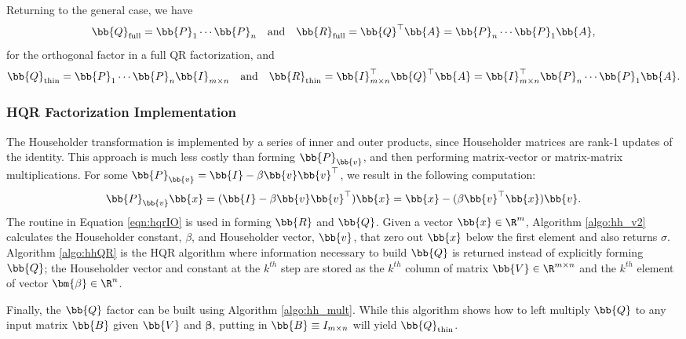 Returning to the general case, we have
\begin{equation}
\bb{Q}_{\text{full}} = \bb{P}_1 \cdots \bb{P}_n\quad \text{and} \quad \bb{R}_{\text{full}} = \bb{Q}^{\top}\bb{A} = \bb{P}_n\cdots \bb{P}_1\bb{A},
\end{equation}
for the orthogonal factor in a full QR factorization, and
\begin{equation}
\bb{Q}_{\text{thin}} = \bb{P}_1 \cdots \bb{P}_n\bb{I}_{m\times n}\quad \text{and} \quad \bb{R}_{\text{thin}} = \bb{I}_{m\times n}^{\top}\bb{Q}^{\top}\bb{A} = \bb{I}_{m\times n}^{\top}\bb{P}_n\cdots \bb{P}_1\bb{A}.
\end{equation}

\subsubsection{HQR Factorization Implementation}
\label{sssec:HQRfI}
The Householder transformation is implemented by a series of inner and outer products, since Householder matrices are rank-1 updates of the identity. 
This approach is much less costly than forming $\bb{P}_{\bb{v}}$, and then performing matrix-vector or matrix-matrix multiplications.
For some $\bb{P}_{\bb{v}}=\bb{I}-\beta \bb{v}\bb{v}^{\top}$, we result in the following computation:
\begin{equation}
\label{eqn:hqrIO}
\bb{P}_{\bb{v}} \bb{x} = (\bb{I}-\beta \bb{v}\bb{v}^{\top})\bb{x} = \bb{x} - (\beta \bb{v}^{\top}\bb{x})\bb{v}.
\end{equation}
The routine in Equation \ref{eqn:hqrIO} is used in forming $\bb{R}$  and $\bb{Q}$. 
Given a vector $\bb{x}\in\R^{m}$, Algorithm \ref{algo:hh_v2} calculates the Householder constant, $\beta$, and Householder vector, $\bb{v}$, that zero out $\bb{x}$ below the first element and also returns $\sigma$. 
Algorithm \ref{algo:hhQR} is the HQR algorithm where information necessary to build $\bb{Q}$ is returned instead of explicitly forming $\bb{Q}$; the Householder vector and constant at the $k^{th}$ step are stored as the $k^{th}$ column of matrix $\bb{V}\in\R^{m\times n}$ and the $k^{th}$ element of vector $\bm{\beta}\in\R^n$. 

Finally, the $\bb{Q}$ factor can be built using Algorithm \ref{algo:hh_mult}.
While this algorithm shows how to left multiply $\bb{Q}$ to any input matrix $\bb{B}$ given $\bb{V}$ and $\bm{\beta}$, putting in $\bb{B}\equiv I_{m\times n}$ will yield $\bb{Q}_{\text{thin}}$.

